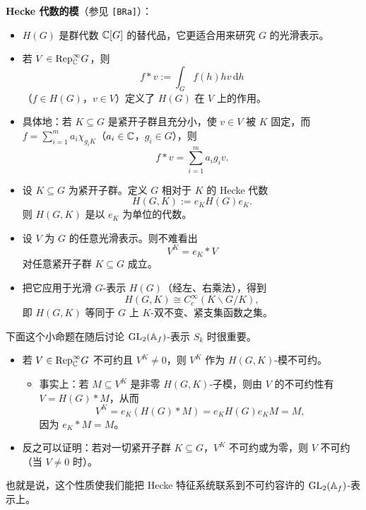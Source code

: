 \textbf{Hecke 代数的模}（参见 \texttt{[BRa]}）：
\begin{itemize}
\item $H(G)$ 是群代数 $\mathbb{C}[G]$ 的替代品，它更适合用来研究 $G$ 的光滑表示。
\item 若 $V\in\mathrm{Rep}^\infty_{\mathbb{C}} G$，则
\[
f*v:=\int_G f(h)hv\,\mathrm{d}h
\]
（$f\in H(G)$，$v\in V$）定义了 $H(G)$ 在 $V$ 上的作用。
\item 具体地：若 $K\subseteq G$ 是紧开子群且充分小，使 $v\in V$ 被 $K$ 固定，而 $f=\sum_{i=1}^m a_i\chi_{g_iK}$（$a_i\in\mathbb{C}$，$g_i\in G$），则
\[
f*v=\sum_{i=1}^m a_ig_iv.
\]
\item 设 $K\subseteq G$ 为紧开子群。定义 $G$ 相对于 $K$ 的 Hecke 代数
\[
H(G,K):=e_KH(G)e_K.
\]
则 $H(G,K)$ 是以 $e_K$ 为单位的代数。
\item 设 $V$ 为 $G$ 的任意光滑表示。则不难看出
\[
V^K=e_K*V
\]
对任意紧开子群 $K\subseteq G$ 成立。
\item 把它应用于光滑 $G$-表示 $H(G)$（经左、右乘法），得到
\[
H(G,K)\cong C_c^\infty(K\backslash G/K),
\]
即 $H(G,K)$ 等同于 $G$ 上 $K$-双不变、紧支集函数之集。
\end{itemize}

下面这个小命题在随后讨论 $\operatorname{GL}_2(\mathbb{A}_f)$-表示 $S_k$ 时很重要。
\begin{itemize}
\item 若 $V\in\mathrm{Rep}^\infty_{\mathbb{C}} G$ 不可约且 $V^K\neq0$，则 $V^K$ 作为 $H(G,K)$-模不可约。
\begin{itemize}
\item 事实上：若 $M\subseteq V^K$ 是非零 $H(G,K)$-子模，则由 $V$ 的不可约性有 $V=H(G)*M$，从而
\[
V^K=e_K(H(G)*M)=e_KH(G)e_KM=M,
\]
因为 $e_K*M=M$。
\end{itemize}
\item 反之可以证明：若对一切紧开子群 $K\subseteq G$，$V^K$ 不可约或为零，则 $V$ 不可约（当 $V\neq0$ 时）。
\end{itemize}

也就是说，这个性质使我们能把 Hecke 特征系统联系到不可约容许的 $\operatorname{GL}_2(\mathbb{A}_f)$-表示上。

